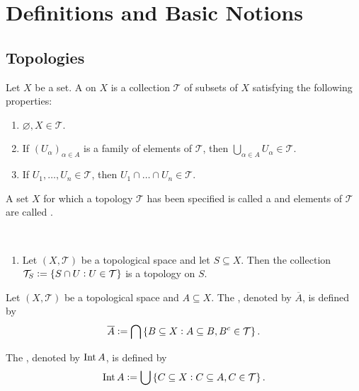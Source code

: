\section{Definitions and Basic Notions}
\subsection{Topologies}

\begin{definition}
	Let $X$ be a set. A  on $X$ is a collection $\mathcal{T}$ of subsets of $X$ satisfying the following properties:
	\begin{enumerate}
		\item $\varnothing, X \in \mathcal{T}$.
		\item If $(U_\alpha)_{\alpha \in A}$ is a family of elements of $\mathcal{T}$, then $\bigcup_{\alpha \in A} U_\alpha \in \mathcal{T}$.
		\item If $U_1,\dots,U_n \in \mathcal{T}$, then $U_1 \cap \dots \cap U_n \in \mathcal{T}$.
	\end{enumerate}

	A set $X$ for which a topology $\mathcal{T}$ has been specified is called a  and elements of $\mathcal{T}$ are called . 
\end{definition}

\begin{example}[Topologies]
	~
	\begin{enumerate}[label = \textup{(}\alph*\textup{)}]
		\item Let $(X,\mathcal{T})$ be a topological space and let $S \subseteq X$. Then the collection $\mathcal{T}_S := \cbr[0]{S \cap U : U \in \mathcal{T}}$ is a topology on $S$.
	\end{enumerate}
\end{example}

\begin{definition}
	Let $(X,\mathcal{T})$ be a topological space and $A \subseteq X$. The , denoted by $\overline{A}$, is defined by 
	\begin{equation}
		\overline{A} := \bigcap\cbr[0]{B \subseteq X : A \subseteq B, B^c \in \mathcal{T}}.
	\end{equation}

	The , denoted by $\operatorname{Int} A$, is defined by 
	\begin{equation}
		\Int A := \bigcup\cbr[0]{C \subseteq X: C \subseteq A, C \in \mathcal{T}}.	
	\end{equation}
\end{definition}


